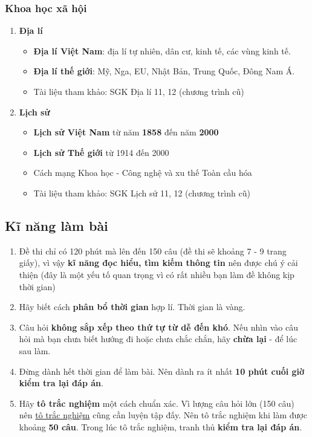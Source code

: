 \subsubsection{Khoa học xã hội}
\begin{enumerate}
    \item\textbf{Địa lí}
    \begin{itemize}
        \item \textbf{Địa lí Việt Nam}: địa lí tự nhiên, dân cư, kinh tế, các vùng kinh tế.
        \item \textbf{Địa lí thế giới}: Mỹ, Nga, EU, Nhật Bản, Trung Quốc, Đông Nam Á.
        \item Tài liệu tham khảo: SGK Địa lí 11, 12 (chương trình cũ)
    \end{itemize}
    \item\textbf{Lịch sử}
    \begin{itemize}
        \item \textbf{Lịch sử Việt Nam} từ năm \textbf{1858} đến năm \textbf{2000}
        \item \textbf{Lịch sử Thế giới} từ 1914 đến 2000
        \item Cách mạng Khoa học - Công nghệ và xu thế Toàn cầu hóa
        \item Tài liệu tham khảo: SGK Lịch sử 11, 12 (chương trình cũ)
    \end{itemize}
\end{enumerate}


\subsection{Kĩ năng làm bài}
\begin{enumerate}
    \item Đề thi chỉ có 120 phút mà lên đến 150 câu (đề thi sẽ khoảng 7 - 9 trang giấy), vì vậy \textbf{kĩ năng đọc hiểu, tìm kiếm thông tin} nên được chú ý cải thiện (đây là một yếu tố quan trọng vì có rất nhiều bạn làm đề không kịp thời gian)
    \item Hãy biết cách \textbf{phân bổ thời gian} hợp lí. Thời gian là vàng.
    \item Câu hỏi \textbf{không sắp xếp theo thứ tự từ dễ đến khó}. Nếu nhìn vào câu hỏi mà bạn chưa biết hướng đi hoặc chưa chắc chắn, hãy \textbf{chừa lại} - để lúc sau làm.
    \item Đừng dành hết thời gian để làm bài. Nên dành ra ít nhất \textbf{10 phút cuối giờ kiểm tra lại đáp án}.
    \item Hãy \textbf{tô trắc nghiệm} một cách chuẩn xác. Vì lượng câu hỏi lớn (150 câu) nên \hyperref[sec:giaidephongthi]{tô trắc nghiệm} cũng cần luyện tập đấy. Nên tô trắc nghiệm khi làm được khoảng \textbf{50 câu}. Trong lúc tô trắc nghiệm, tranh thủ \textbf{kiểm tra lại đáp án}.
\end{enumerate}

\label{sec:kinanglambai}